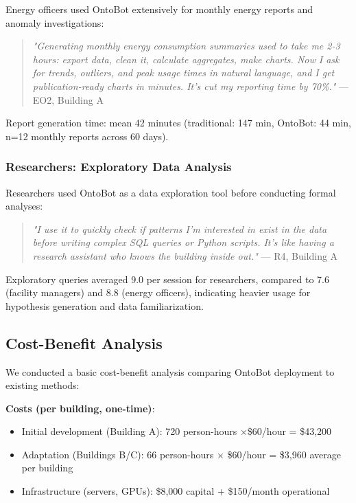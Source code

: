 \documentclass[acmlarge]{acmart}
\begin{document}
Energy officers used OntoBot extensively for monthly energy reports and anomaly investigations:

\begin{quote}
\textit{"Generating monthly energy consumption summaries used to take me 2-3 hours: export data, clean it, calculate aggregates, make charts. Now I ask for trends, outliers, and peak usage times in natural language, and I get publication-ready charts in minutes. It's cut my reporting time by 70\%."} — EO2, Building A
\end{quote}

Report generation time: mean 42 minutes (traditional: 147 min, OntoBot: 44 min, n=12 monthly reports across 60 days).

\subsubsection{Researchers: Exploratory Data Analysis}

Researchers used OntoBot as a data exploration tool before conducting formal analyses:

\begin{quote}
\textit{"I use it to quickly check if patterns I'm interested in exist in the data before writing complex SQL queries or Python scripts. It's like having a research assistant who knows the building inside out."} — R4, Building A
\end{quote}

Exploratory queries averaged 9.0 per session for researchers, compared to 7.6 (facility managers) and 8.8 (energy officers), indicating heavier usage for hypothesis generation and data familiarization.

\subsection{Cost-Benefit Analysis}

We conducted a basic cost-benefit analysis comparing OntoBot deployment to existing methods:

\textbf{Costs (per building, one-time)}:
\begin{itemize}
    \item Initial development (Building A): 720 person-hours ×\$60/hour = \$43,200
    \item Adaptation (Buildings B/C): 66 person-hours × \$60/hour = \$3,960 average per building
    \item Infrastructure (servers, GPUs): \$8,000 capital + \$150/month operational
\end{itemize}
\end{document}
